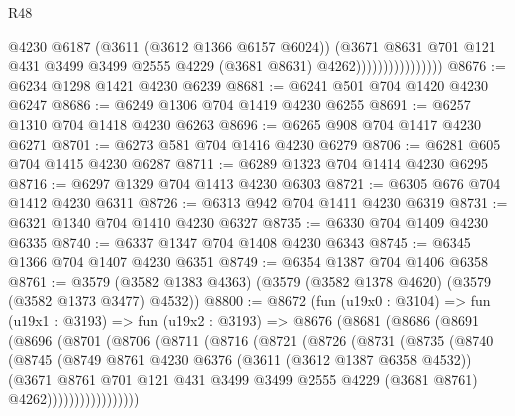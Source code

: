\begin{lexlean}{R48}
\begin{coremodule}
                                  @4230
                                  @6187
                                  (@3611 (@3612 @1366 @6157 @6024))
                                  (@3671
                                    @8631
                                    @701
                                    @121
                                    @431
                                    @3499
                                    @3499
                                    @2555
                                    @4229
                                    (@3681 @8631)
                                    @4262))))))))))))))))
@8676 := @6234 @1298 @1421 @4230 @6239
@8681 := @6241 @501 @704 @1420 @4230 @6247
@8686 := @6249 @1306 @704 @1419 @4230 @6255
@8691 := @6257 @1310 @704 @1418 @4230 @6263
@8696 := @6265 @908 @704 @1417 @4230 @6271
@8701 := @6273 @581 @704 @1416 @4230 @6279
@8706 := @6281 @605 @704 @1415 @4230 @6287
@8711 := @6289 @1323 @704 @1414 @4230 @6295
@8716 := @6297 @1329 @704 @1413 @4230 @6303
@8721 := @6305 @676 @704 @1412 @4230 @6311
@8726 := @6313 @942 @704 @1411 @4230 @6319
@8731 := @6321 @1340 @704 @1410 @4230 @6327
@8735 := @6330 @704 @1409 @4230 @6335
@8740 := @6337 @1347 @704 @1408 @4230 @6343
@8745 := @6345 @1366 @704 @1407 @4230 @6351
@8749 := @6354 @1387 @704 @1406 @6358
@8761 := @3579 (@3582 @1383 @4363) (@3579 (@3582 @1378 @4620) (@3579 (@3582 @1373 @3477) @4532))
@8800 := @8672
    (fun (u19x0 : @3104) =>
    fun (u19x1 : @3193) =>
    fun (u19x2 : @3193) =>
    @8676
      (@8681
        (@8686
          (@8691
            (@8696
              (@8701
                (@8706
                  (@8711
                    (@8716
                      (@8721
                        (@8726
                          (@8731
                            (@8735
                              (@8740
                                (@8745
                                  (@8749
                                    @8761
                                    @4230
                                    @6376
                                    (@3611 (@3612 @1387 @6358 @4532))
                                    (@3671
                                      @8761
                                      @701
                                      @121
                                      @431
                                      @3499
                                      @3499
                                      @2555
                                      @4229
                                      (@3681 @8761)
                                      @4262)))))))))))))))))

\end{coremodule}
\end{lexlean}
